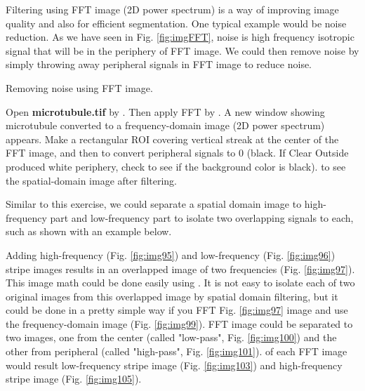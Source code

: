 Filtering using FFT image (2D power spectrum) is a way of improving image quality and
also for efficient segmentation. One typical example would be noise
reduction. As we have seen in Fig. \ref{fig:imgFFT}, noise is high frequency
isotropic signal that will be in the periphery of FFT image. We
could then remove noise by simply throwing away peripheral signals in FFT
image to reduce noise. 

\begin{indentexercise}{1} Removing noise using FFT image. 

Open \textbf{microtubule.tif} by . Then apply FFT
by . A new
window showing microtubule converted to a frequency-domain image (2D power spectrum) appears. Make
a rectangular ROI covering vertical streak at the center of the FFT
image, and then  to
convert peripheral signals to 0 (black. If Clear Outside produced white
periphery, check  to
see if the background color is black).  to see the spatial-domain image after
filtering.
\end{indentexercise}

Similar to this exercise, we could separate a spatial domain image to high-frequency part
and low-frequency part to isolate two overlapping signals to each, such as shown
with an example below.
 
Adding high-frequency (Fig. \ref{fig:img95}) and low-frequency (Fig. \ref{fig:img96}) stripe images 
results in an overlapped image of two frequencies (Fig. \ref{fig:img97}). This image math could be done
easily using  . It is not easy
to isolate each of two original images from this overlapped image by spatial domain filtering, but
it could be done in a pretty simple way if you FFT Fig. \ref{fig:img97} image and use the frequency-domain image (Fig. \ref{fig:img99}). 
FFT image could be separated to two images, one from the center (called "low-pass", Fig. \ref{fig:img100}) 
and the other from peripheral (called "high-pass",  Fig. \ref{fig:img101}). 
 of each FFT image would result low-frequency stripe image  (Fig. \ref{fig:img103}) and
high-frequency stripe image (Fig. \ref{fig:img105}).

